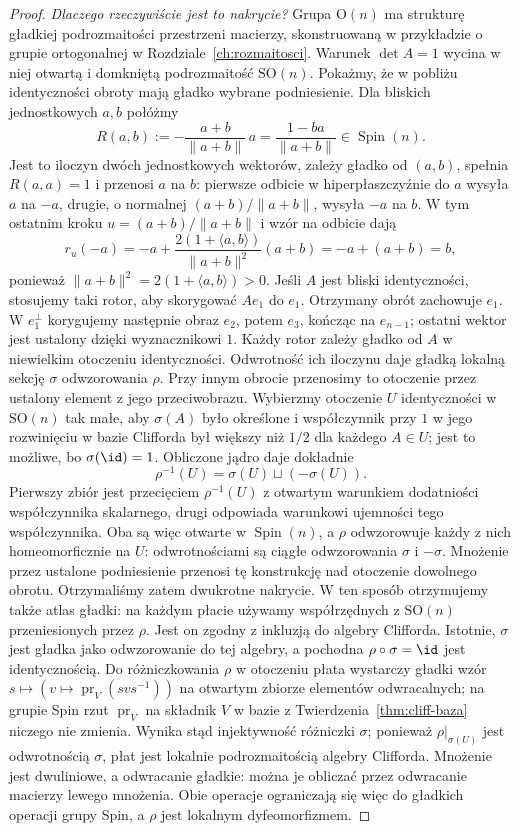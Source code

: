 \begin{proof}
\emph{Dlaczego rzeczywiście jest to nakrycie?}
Grupa $\mathrm O(n)$ ma strukturę gładkiej podrozmaitości
przestrzeni macierzy, skonstruowaną w przykładzie o grupie
ortogonalnej w Rozdziale~\ref{ch:rozmaitosci}.
Warunek $\det A=1$ wycina w niej otwartą i domkniętą
podrozmaitość $\mathrm{SO}(n)$.
Pokażmy, że w pobliżu identyczności obroty mają
gładko wybrane podniesienie. Dla bliskich
jednostkowych $a,b$ połóżmy
\[
 R(a,b):=-\frac{a+b}{\|a+b\|}\,a
       =\frac{1-ba}{\|a+b\|}\in\operatorname{Spin}(n).
\]
Jest to iloczyn dwóch jednostkowych wektorów,
zależy gładko od $(a,b)$, spełnia $R(a,a)=1$
i przenosi $a$ na $b$: pierwsze odbicie w
hiperpłaszczyźnie do $a$ wysyła $a$ na $-a$,
drugie, o normalnej $(a+b)/\|a+b\|$, wysyła
$-a$ na $b$.
W tym ostatnim kroku $u=(a+b)/\|a+b\|$ i wzór na odbicie dają
\[
 r_u(-a)
 =-a+\frac{2(1+\langle a,b\rangle)}{\|a+b\|^2}(a+b)
 =-a+(a+b)=b,
\]
ponieważ $\|a+b\|^2=2(1+\langle a,b\rangle)>0$.
Jeśli $A$ jest bliski identyczności,
stosujemy taki rotor, aby skorygować $Ae_1$ do
$e_1$. Otrzymany obrót zachowuje $e_1$.
W $e_1^\perp$ korygujemy następnie obraz
$e_2$, potem $e_3$, kończąc na $e_{n-1}$;
ostatni wektor jest ustalony dzięki wyznacznikowi
$1$. Każdy rotor zależy gładko od $A$
w niewielkim otoczeniu identyczności.
Odwrotność ich iloczynu daje gładką lokalną
sekcję $\sigma$ odwzorowania $\rho$.
Przy innym obrocie przenosimy to otoczenie
przez ustalony element z jego przeciwobrazu.
Wybierzmy otoczenie $U$ identyczności w $\mathrm{SO}(n)$
tak małe, aby $\sigma(A)$ było określone i współczynnik
przy $1$ w jego rozwinięciu w bazie Clifforda był większy
niż $1/2$ dla każdego $A\in U$; jest to możliwe, bo
$\sigma(\id)=1$. Obliczone jądro daje dokładnie
\[
 \rho^{-1}(U)=\sigma(U)\sqcup(-\sigma(U)).
\]
Pierwszy zbiór jest przecięciem $\rho^{-1}(U)$
z otwartym warunkiem dodatniości współczynnika skalarnego,
drugi odpowiada warunkowi ujemności tego współczynnika.
Oba są więc otwarte w $\operatorname{Spin}(n)$, a $\rho$
odwzorowuje każdy z nich homeomorficznie na $U$:
odwrotnościami są ciągłe odwzorowania $\sigma$ i $-\sigma$.
Mnożenie przez ustalone podniesienie przenosi tę konstrukcję
nad otoczenie dowolnego obrotu. Otrzymaliśmy zatem
dwukrotne nakrycie.
W ten sposób otrzymujemy także atlas gładki: na każdym płacie
używamy współrzędnych z $\mathrm{SO}(n)$ przeniesionych przez $\rho$.
Jest on zgodny z inkluzją do algebry Clifforda. Istotnie,
$\sigma$ jest gładka jako odwzorowanie do tej algebry, a pochodna
$\rho\circ\sigma=\id$ jest identycznością. Do różniczkowania
$\rho$ w otoczeniu płata wystarczy gładki wzór
$s\mapsto(v\mapsto\operatorname{pr}_V(svs^{-1}))$
na otwartym zbiorze elementów odwracalnych; na grupie Spin
rzut $\operatorname{pr}_V$ na składnik $V$ w bazie
z Twierdzenia~\ref{thm:cliff-baza} niczego nie zmienia.
Wynika stąd injektywność różniczki $\sigma$; ponieważ
$\rho|_{\sigma(U)}$ jest odwrotnością $\sigma$, płat
jest lokalnie podrozmaitością algebry Clifforda. Mnożenie jest
dwuliniowe, a odwracanie gładkie: można je obliczać przez
odwracanie macierzy lewego mnożenia. Obie operacje ograniczają
się więc do gładkich operacji grupy Spin, a $\rho$ jest lokalnym dyfeomorfizmem.
\end{proof}


